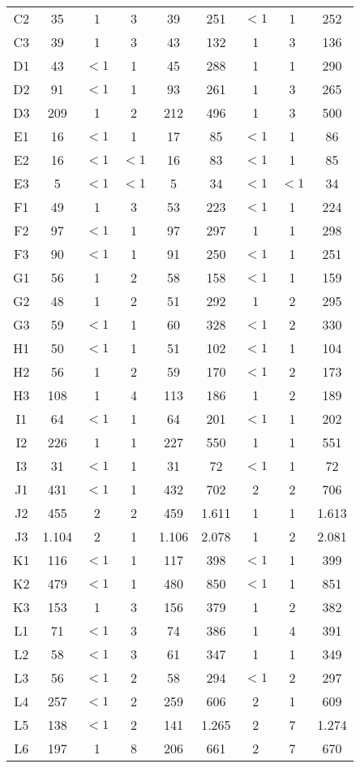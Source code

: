 \begin{center}
\begin{longtable}{ccccc|cccc}
C2&35&1&3&39&251&$<1$&1&252\\
C3&39&1&3&43&132&1&3&136\\
D1&43&$<1$&1&45&288&1&1&290\\
D2&91&$<1$&1&93&261&1&3&265\\
D3&209&1&2&212&496&1&3&500\\
E1&16&$<1$&1&17&85&$<1$&1&86\\
E2&16&$<1$&$<1$&16&83&$<1$&1&85\\
E3&5&$<1$&$<1$&5&34&$<1$&$<1$&34\\
F1&49&1&3&53&223&$<1$&1&224\\
F2&97&$<1$&1&97&297&1&1&298\\
F3&90&$<1$&1&91&250&$<1$&1&251\\
G1&56&1&2&58&158&$<1$&1&159\\
G2&48&1&2&51&292&1&2&295\\
G3&59&$<1$&1&60&328&$<1$&2&330\\
H1&50&$<1$&1&51&102&$<1$&1&104\\
H2&56&1&2&59&170&$<1$&2&173\\
H3&108&1&4&113&186&1&2&189\\
I1&64&$<1$&1&64&201&$<1$&1&202\\
I2&226&1&1&227&550&1&1&551\\
I3&31&$<1$&1&31&72&$<1$&1&72\\
J1&431&$<1$&1&432&702&2&2&706\\
J2&455&2&2&459&1.611&1&1&1.613\\
J3&1.104&2&1&1.106&2.078&1&2&2.081\\
K1&116&$<1$&1&117&398&$<1$&1&399\\
K2&479&$<1$&1&480&850&$<1$&1&851\\
K3&153&1&3&156&379&1&2&382\\
L1&71&$<1$&3&74&386&1&4&391\\
L2&58&$<1$&3&61&347&1&1&349\\
L3&56&$<1$&2&58&294&$<1$&2&297\\
L4&257&$<1$&2&259&606&2&1&609\\
L5&138&$<1$&2&141&1.265&2&7&1.274\\
L6&197&1&8&206&661&2&7&670\\
\end{longtable}
\end{center}

